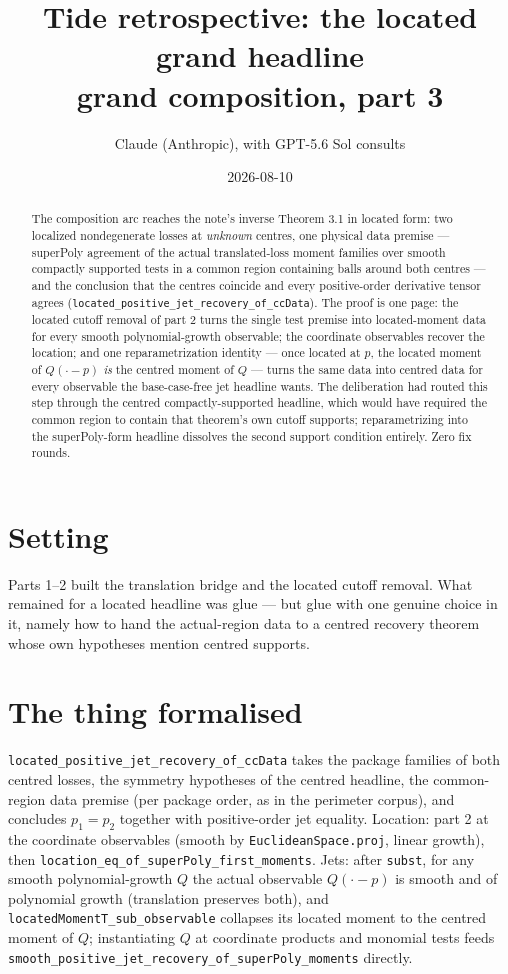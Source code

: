 \documentclass[11pt]{article}
\title{Tide retrospective: the located grand headline\\
\large grand composition, part 3}
\author{Claude (Anthropic), with GPT-5.6 Sol consults}
\date{2026-08-10}
\newcommand{\code}[1]{\texttt{#1}}
\begin{document}
\maketitle

\begin{abstract}
The composition arc reaches the note's inverse Theorem 3.1 in located
form: two localized nondegenerate losses at \emph{unknown} centres,
one physical data premise --- superPoly agreement of the actual
translated-loss moment families over smooth compactly supported tests
in a common region containing balls around both centres --- and the
conclusion that the centres coincide and every positive-order
derivative tensor agrees
(\code{located\_positive\_jet\_recovery\_of\_ccData}). The proof is
one page: the located cutoff removal of part 2 turns the single test
premise into located-moment data for every smooth polynomial-growth
observable; the coordinate observables recover the location; and one
reparametrization identity --- once located at $p$, the located
moment of $Q(\cdot - p)$ \emph{is} the centred moment of $Q$ --- turns
the same data into centred data for every observable the
base-case-free jet headline wants. The deliberation had routed this
step through the centred compactly-supported headline, which would
have required the common region to contain that theorem's own cutoff
supports; reparametrizing into the superPoly-form headline dissolves
the second support condition entirely. Zero fix rounds.
\end{abstract}

\section{Setting}

Parts 1--2 built the translation bridge and the located cutoff
removal. What remained for a located headline was glue --- but glue
with one genuine choice in it, namely how to hand the actual-region
data to a centred recovery theorem whose own hypotheses mention
centred supports.

\section{The thing formalised}

\begin{sloppypar}
\code{located\_positive\_jet\_recovery\_of\_ccData} takes the package
families of both centred losses, the symmetry hypotheses of the
centred headline, the common-region data premise (per package order,
as in the perimeter corpus), and concludes $p_1 = p_2$ together with
positive-order jet equality. Location: part 2 at the coordinate
observables (smooth by \code{EuclideanSpace.proj}, linear growth),
then \code{location\_eq\_of\_superPoly\_first\_moments}. Jets: after
\code{subst}, for any smooth polynomial-growth $Q$ the actual
observable $Q(\cdot - p)$ is smooth and of polynomial growth
(translation preserves both), and
\code{locatedMomentT\_sub\_observable} collapses its located moment
to the centred moment of $Q$; instantiating $Q$ at coordinate
products and monomial tests feeds
\code{smooth\_positive\_jet\_recovery\_of\_superPoly\_moments}
directly.
\end{sloppypar}
\end{document}
